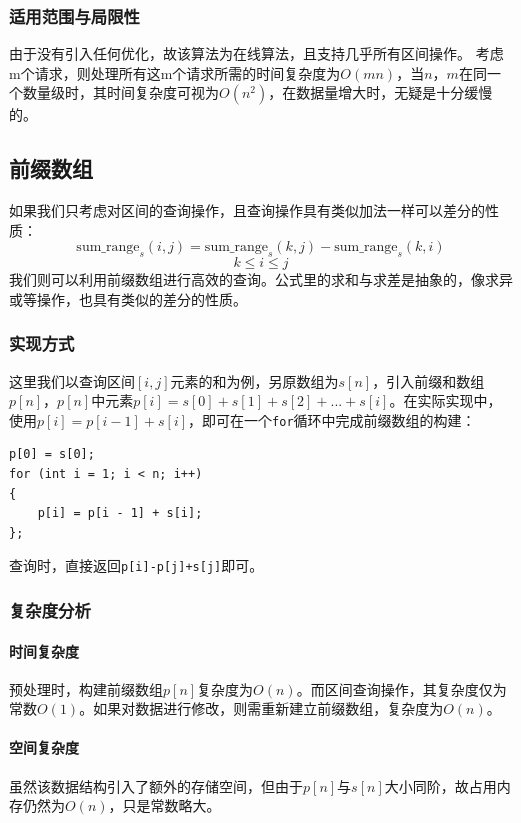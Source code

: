 \documentclass{cjc}
\begin{document}
\subsubsection{适用范围与局限性}
由于没有引入任何优化，故该算法为在线算法，且支持几乎所有区间操作。
考虑m个请求，则处理所有这m个请求所需的时间复杂度为$O(mn)$，当$n$，$m$在同一个数量级时，其时间复杂度可视为$O(n^2)$，在数据量增大时，无疑是十分缓慢的。

\subsection{前缀数组}

如果我们只考虑对区间的查询操作，且查询操作具有类似加法一样可以差分的性质：
\begin{equation*}
  \text{sum\_range} _s(i,j) = \text{sum\_range} _s(k,j) - \text{sum\_range} _s(k,i)
\end{equation*}
\begin{equation*}
  k \leq i \leq j
\end{equation*}
我们则可以利用前缀数组进行高效的查询。公式里的求和与求差是抽象的，像求异或等操作，也具有类似的差分的性质。
\subsubsection{实现方式}
这里我们以查询区间$[i,j]$元素的和为例，另原数组为$s[n]$，引入前缀和数组$p[n]$，$p[n]$中元素$p[i]=s[0]+s[1]+s[2]+...+s[i]$。在实际实现中，使用$p[i]=p[i-1]+s[i]$，即可在一个\lstinline{for}循环中完成前缀数组的构建：
\begin{lstlisting}
p[0] = s[0];
for (int i = 1; i < n; i++)
{
    p[i] = p[i - 1] + s[i];
};
\end{lstlisting}
查询时，直接返回\lstinline{p[i]-p[j]+s[j]}即可。
\subsubsection{复杂度分析}
\paragraph{时间复杂度} 预处理时，构建前缀数组$p[n]$复杂度为$O(n)$。而区间查询操作，其复杂度仅为常数$O(1)$。如果对数据进行修改，则需重新建立前缀数组，复杂度为$O(n)$。
\paragraph{空间复杂度} 虽然该数据结构引入了额外的存储空间，但由于$p[n]$与$s[n]$大小同阶，故占用内存仍然为$O(n)$，只是常数略大。
\end{document}
